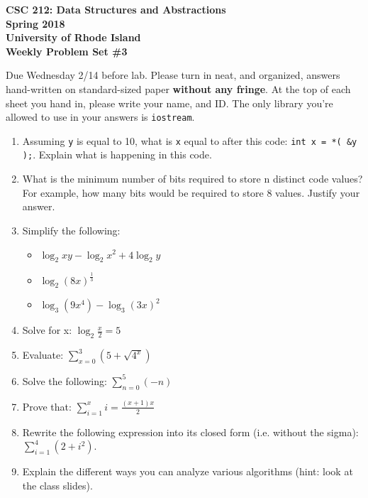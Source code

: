 \documentclass[11pt]{article}
\begin{document}
\thispagestyle{empty}

\begin{center}
    {\Large\bf CSC 212: Data Structures and Abstractions}\\
    \medskip
    {\Large\bf Spring 2018}\\
    \medskip
    {\Large\bf University of Rhode Island}\\
    \bigskip
    {\Large\bf Weekly Problem Set \#3}
\end{center}

Due Wednesday 2/14 before lab. Please turn in neat, and organized, answers hand-written on standard-sized paper \textbf{without any fringe}. At the top of each sheet you hand in, please write your name, and ID.
The only library you're allowed to use in your answers is \verb|iostream|.

\begin{enumerate}[leftmargin=*]

\item Assuming \lstinline|y| is equal to 10, what is \lstinline|x| equal to after this code: \verb|int x = *( &y );|. Explain what is happening in this code.

\item What is the minimum number of bits required to store n distinct code values? For example, how many bits would be required to store 8 values. Justify your answer.

\item Simplify the following: 
\begin{itemize}
    \item \( \log_2 xy - \log_2 x^2 + 4 \log_2 y \)
    \item \( \log_2 (8x)^\frac{1}{3} \)
    \item \( \log_3(9x^4) - \log_3(3x)^2\)
\end{itemize}

\item Solve for x: \( \log_{2} \frac{x}{2} = 5 \)

\item Evaluate: \( \sum\limits_{x=0}^3 (5 + \sqrt{4^x}) \)

\item Solve the following: \( \sum\limits_{n=0}^5 (-n) \)

\item Prove that: \( \sum\limits_{i=1}^{x} i = \frac{(x + 1)x}{2} \)

\item Rewrite the following expression into its closed form (i.e. without the sigma): \( \sum_{i=1}^4 (2 + i^2) \).

\item Explain the different ways you can analyze various algorithms (hint: look at the class slides).

\end{enumerate}
\end{document}
